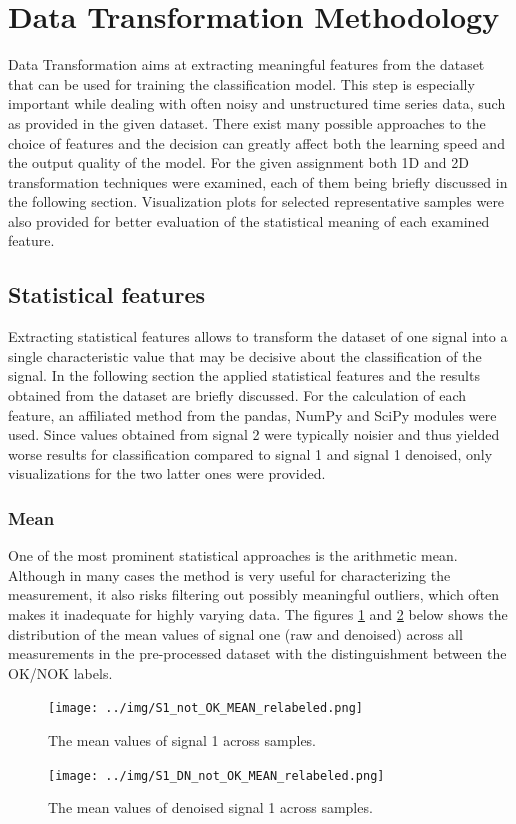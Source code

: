 \documentclass[12pt]{report}
\begin{document}
\section{Data Transformation Methodology}
Data Transformation aims at extracting meaningful features from the dataset that can be used for training the classification model. This step is especially important while dealing with often noisy and unstructured time series data, such as provided in the given dataset. There exist many possible approaches to the choice of features and the decision can greatly affect both the learning speed and the output quality of the model. For the given assignment both 1D and 2D transformation techniques were examined, each of them being briefly discussed in the following section. Visualization plots for selected representative samples were also provided for better evaluation of the statistical meaning of each examined feature.
\subsection{Statistical features}
Extracting statistical features allows to transform the dataset of one signal into a single characteristic value that may be decisive about the classification of the signal. In the following section the applied statistical features and the results obtained from the dataset are briefly discussed. For the calculation of each feature, an affiliated method from the pandas, NumPy and SciPy modules were used. Since values obtained from signal 2 were typically noisier and thus yielded worse results for classification compared to signal 1 and signal 1 denoised, only visualizations for the two latter ones were provided.
\subsubsection{Mean}
One of the most prominent statistical approaches is the arithmetic mean. Although in many cases the method is very useful for characterizing the measurement, it also risks filtering out possibly meaningful outliers, which often makes it inadequate for highly varying data. The figures \ref{fig:S1MEAN} and \ref{fig:S1DNMEAN}  below shows the distribution of the mean values of signal one (raw and denoised) across all measurements in the pre-processed dataset with the distinguishment between the OK/NOK labels.

\begin{figure}[H]
	\texttt{[image: ../img/S1\_not\_OK\_MEAN\_relabeled.png]}
	\caption{The mean values of signal 1 across samples.}
	\label{fig:S1MEAN}
\end{figure}
\begin{figure}[H]
	\texttt{[image: ../img/S1\_DN\_not\_OK\_MEAN\_relabeled.png]}
	\caption{The mean values of denoised signal 1 across samples.}
	\label{fig:S1DNMEAN}
\end{figure}
\end{document}
